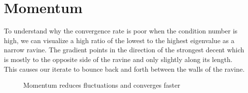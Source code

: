 
\chapter{Momentum}

To understand why the convergence rate is poor when the condition
number is high, we can visualize a high ratio of the lowest to the highest
eigenvalue as a narrow ravine. The gradient points in the direction of the
strongest decent which is mostly to the opposite side of the ravine and only slightly
along its length. This causes our iterate to bounce back and forth between
the walls of the ravine.
%
\begin{figure}[h]
	\centering
	\def\svgwidth{1\textwidth}
	
	\caption{Momentum reduces fluctuations and converges faster}
	\label{fig: visualize bad conditioning}
\end{figure}

